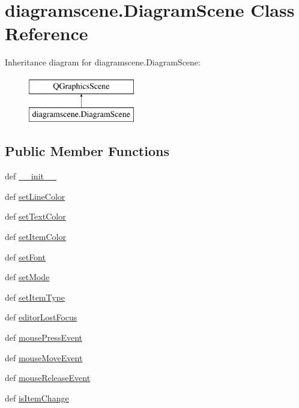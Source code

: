 \hypertarget{classdiagramscene_1_1DiagramScene}{}\section{diagramscene.\+Diagram\+Scene Class Reference}
\label{classdiagramscene_1_1DiagramScene}
Inheritance diagram for diagramscene.\+Diagram\+Scene\+:\begin{figure}[H]
\begin{center}
\leavevmode
\includegraphics[height=2.000000cm]{classdiagramscene_1_1DiagramScene}
\end{center}
\end{figure}
\subsection*{Public Member Functions}
\begin{DoxyCompactItemize}
\item 
def \hyperlink{classdiagramscene_1_1DiagramScene_a862ade1e6a97c6385a6f4b3f535fac65}{\+\_\+\+\_\+init\+\_\+\+\_\+}
\item 
def \hyperlink{classdiagramscene_1_1DiagramScene_a7efec57d81a33f153676bf140c483958}{set\+Line\+Color}
\item 
def \hyperlink{classdiagramscene_1_1DiagramScene_a538bbbd62bec51930eff36d1ecfd1899}{set\+Text\+Color}
\item 
def \hyperlink{classdiagramscene_1_1DiagramScene_a0fe2729e4219334ceb1c397b88022932}{set\+Item\+Color}
\item 
def \hyperlink{classdiagramscene_1_1DiagramScene_ab4140bba55570f5635717adc756ccf7d}{set\+Font}
\item 
def \hyperlink{classdiagramscene_1_1DiagramScene_ab1323d7c5234649931357453cb09d4cb}{set\+Mode}
\item 
def \hyperlink{classdiagramscene_1_1DiagramScene_a0d7c3a731cf954df7f73d2ee720010a6}{set\+Item\+Type}
\item 
def \hyperlink{classdiagramscene_1_1DiagramScene_a15a06c12bbafcdb14fb3a471f17fff22}{editor\+Lost\+Focus}
\item 
def \hyperlink{classdiagramscene_1_1DiagramScene_a950f5abde52ad509bf0e748ce363c558}{mouse\+Press\+Event}
\item 
def \hyperlink{classdiagramscene_1_1DiagramScene_a139ae2308406b31785d3fcc999a749f9}{mouse\+Move\+Event}
\item 
def \hyperlink{classdiagramscene_1_1DiagramScene_a8a79751a3aac4b38229ce3449210469f}{mouse\+Release\+Event}
\item 
def \hyperlink{classdiagramscene_1_1DiagramScene_a983c61936d0339c285fc5d8e8bf804a7}{is\+Item\+Change}
\end{DoxyCompactItemize}
